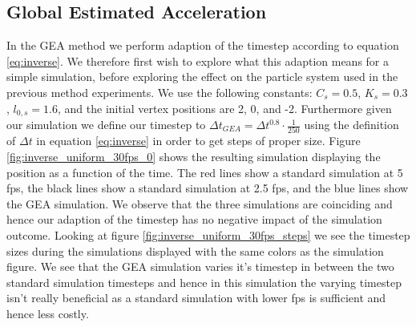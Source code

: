 \documentclass[11pt]{article}
\begin{document}
\subsection{Global Estimated Acceleration}
\label{sec:experiments_inverse}
In the GEA method we perform adaption of the timestep according to equation
\ref{eq:inverse}. We therefore first wish to explore what this adaption
means for a simple simulation, before exploring the effect on the particle
system used in the previous method experiments. We use the following
constants: $C_s = 0.5$, $K_s = 0.3$, $l_{0,s} = 1.6$, and the initial vertex
positions are 2, 0, and -2. Furthermore given our simulation we define our
timestep to $\Delta t_{GEA} = \Delta t^{0.8}\cdot \frac{1}{250}$ using
the definition of $\Delta t$ in equation \ref{eq:inverse} in order to get
steps of proper size. Figure \ref{fig:inverse_uniform_30fps_0} shows the
resulting simulation displaying the position as a function of the time.
The red lines show a standard simulation at 5 fps, the black lines show a
standard simulation at 2.5 fps, and the blue lines show the GEA simulation.
We observe that the three simulations are coinciding and hence our adaption of
the timestep has no negative impact of the simulation outcome. Looking at figure
\ref{fig:inverse_uniform_30fps_steps} we see the timestep sizes during the
simulations displayed with the same colors as the simulation figure. We see
that the GEA simulation varies it's timestep in between the two standard
simulation timesteps and hence in this simulation the varying timestep isn't
really beneficial as a standard simulation with lower fps is sufficient and
hence less costly.
\end{document}
